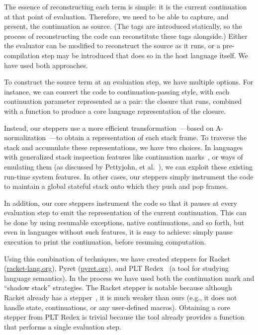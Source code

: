 The essence of reconstructing each term is simple: it is the current
continuation at that point of evaluation. Therefore, we need to be
able to capture, and present, the continuation as source. (The tags
are introduced statically, so the process of reconstructing the code
can reconstitute these tags alongside.) Either the evaluator can be
modified to reconstruct the source as it runs, or a pre-compilation step
may be introduced that does so in the host language itself. We have used
both approaches.

To construct the source term at an evaluation step, we have multiple
options. For instance,
we can convert the code to continuation-passing style, with each
continuation parameter represented as a pair: the closure that runs,
combined with a function to produce a core language representation of
the closure.

Instead, our steppers use a more efficient
transformation~\cite{continuations-from-stack}---based on
A-normalization~\cite{a-normal-form}---to obtain a representation of
each stack frame. To traverse the stack and accumulate these
representations, we have two choices. In languages with generalized
stack inspection features like continuation
marks~\cite{clements:thesis}, or ways of emulating them (as discussed
by Pettyjohn, et al.~\cite{continuations-from-stack}), we can exploit
these existing run-time system features. In other cases, our steppers simply instrument
the code to maintain a global stateful stack onto which they push and
pop frames.

In addition, our core steppers instrument the code so that it pauses at
every evaluation step to emit the representation of the current
continuation. This can be done by using resumable exceptions, native
continuations, and so forth, but even in languages without such
features, it is easy to achieve: simply pause execution to print the
continuation, before resuming computation.

Using this combination of techniques, we have created steppers for Racket
(\url{racket-lang.org}), Pyret (\url{pyret.org}), and PLT Redex~\cite{redex} (a tool for studying
language semantics). In the
process we have used both the continuation mark and ``shadow stack''
strategies.  The Racket stepper is notable because although Racket
already has a stepper~\cite{racket-stepper},
it is much weaker than ours (e.g., it
does not handle state, continuations, or any user-defined
macros). Obtaining a core stepper from PLT Redex is trivial because the tool already
provides a function that performs a single evaluation step.

